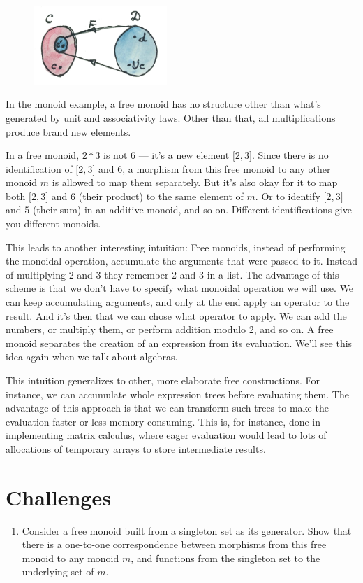 \begin{figure}[H]
\centering
\includegraphics[width=0.45\textwidth]{images/freeimage.jpg}
\end{figure}

\noindent
In the monoid example, a free monoid has no structure other than what's
generated by unit and associativity laws. Other than that, all
multiplications produce brand new elements.

In a free monoid, $2 * 3$ is not $6$ --- it's a new element ${[}2, 3{]}$. Since
there is no identification of ${[}2, 3{]}$ and $6$, a morphism from this
free monoid to any other monoid $m$ is allowed to map them
separately. But it's also okay for it to map both ${[}2, 3{]}$ and $6$
(their product) to the same element of $m$. Or to identify ${[}2,
3{]}$ and $5$ (their sum) in an additive monoid, and so on. Different
identifications give you different monoids.

This leads to another interesting intuition: Free monoids, instead of
performing the monoidal operation, accumulate the arguments that were
passed to it. Instead of multiplying $2$ and $3$ they remember $2$ and $3$ in a
list. The advantage of this scheme is that we don't have to specify what
monoidal operation we will use. We can keep accumulating arguments, and
only at the end apply an operator to the result. And it's then that we
can chose what operator to apply. We can add the numbers, or multiply
them, or perform addition modulo 2, and so on. A free monoid separates
the creation of an expression from its evaluation. We'll see this idea
again when we talk about algebras.

This intuition generalizes to other, more elaborate free constructions.
For instance, we can accumulate whole expression trees before evaluating
them. The advantage of this approach is that we can transform such trees
to make the evaluation faster or less memory consuming. This is, for
instance, done in implementing matrix calculus, where eager evaluation
would lead to lots of allocations of temporary arrays to store
intermediate results.

\section{Challenges}

\begin{enumerate}
\tightlist
\item
  Consider a free monoid built from a singleton set as its generator.
  Show that there is a one-to-one correspondence between morphisms from
  this free monoid to any monoid $m$, and functions from the
  singleton set to the underlying set of $m$.
\end{enumerate}
